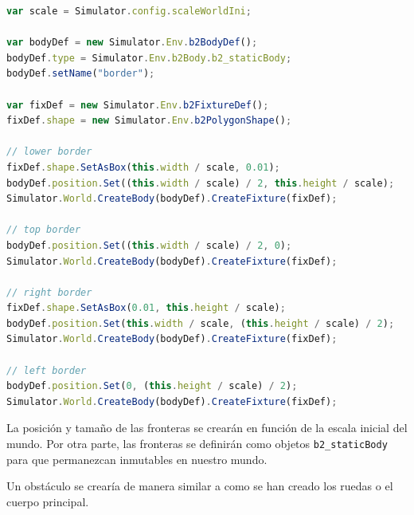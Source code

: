 \begin{lstlisting}[language={Javascript},label={code:creacion-fronteras}, caption={Función que crea las fronteras del mundo.}]
var scale = Simulator.config.scaleWorldIni;

var bodyDef = new Simulator.Env.b2BodyDef();
bodyDef.type = Simulator.Env.b2Body.b2_staticBody;
bodyDef.setName("border");

var fixDef = new Simulator.Env.b2FixtureDef();
fixDef.shape = new Simulator.Env.b2PolygonShape();

// lower border
fixDef.shape.SetAsBox(this.width / scale, 0.01);
bodyDef.position.Set((this.width / scale) / 2, this.height / scale);
Simulator.World.CreateBody(bodyDef).CreateFixture(fixDef);

// top border
bodyDef.position.Set((this.width / scale) / 2, 0);
Simulator.World.CreateBody(bodyDef).CreateFixture(fixDef);

// right border
fixDef.shape.SetAsBox(0.01, this.height / scale);
bodyDef.position.Set(this.width / scale, (this.height / scale) / 2);
Simulator.World.CreateBody(bodyDef).CreateFixture(fixDef);

// left border
bodyDef.position.Set(0, (this.height / scale) / 2);
Simulator.World.CreateBody(bodyDef).CreateFixture(fixDef);
\end{lstlisting}

La posición y tamaño de las fronteras se crearán en función de la escala inicial del mundo. Por otra parte, las fronteras se definirán como objetos \texttt{b2\_staticBody} para que permanezcan inmutables en nuestro mundo.

Un obstáculo se crearía de manera similar a como se han creado los ruedas o el cuerpo principal.

